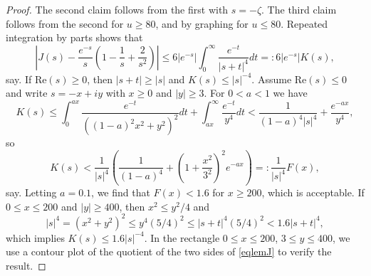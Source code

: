 \documentclass[11pt]{amsart}
\begin{document}
\begin{proof}
The second claim follows from the first with $s=-\zeta$. 
The third claim follows from the second for $u\ge 80$, and by graphing for $u\le 80$. 
Repeated integration by parts shows that 
$$
\left|J(s)-\frac{e^{-s}}{s}\left(1-\frac{1}{s}+\frac{2}{s^2}\right) \right| 
\le 6 |e^{-s}| \int_0^\infty \frac{e^{-t}}{|s+t|^4}dt
=:  6 |e^{-s}|   K(s),
$$
say. If $\mathrm{Re}(s)\ge 0$, then $|s+t|\ge |s|$ and $K(s)\le |s|^{-4}$. 
Assume $\mathrm{Re}(s)\le 0$ and write $s=-x+iy$ with $x\ge 0$ and $|y|\ge 3$. 
For $0<a<1$ we have
$$
K(s) \le \int_0^{ax}\frac{e^{-t}}{((1-a)^2 x^2+y^2)^2} dt + \int_{ax}^\infty \frac{e^{-t}}{y^4}dt<\frac{1}{(1-a)^4|s|^4}+\frac{e^{-ax}}{y^4},
$$
so
$$
K(s) < \frac{1}{|s|^4} \left(\frac{1}{(1-a)^4}+ \left(1+\frac{x^2}{3^2}\right)^2 e^{-ax}\right) =: \frac{1}{|s|^4} F(x),
$$
say. Letting $a=0.1$, we find that $F(x)<1.6$ for $x\ge 200$, which is acceptable. 
If $0\le x \le 200$ and $|y|\ge 400$, then $x^2 \le y^2/4$ and 
$$
|s|^4 =(x^2+y^2)^2 \le y^4 (5/4)^2 \le |s+t|^4 (5/4)^2< 1.6 |s+t|^4,
$$
which implies $K(s)\le 1.6|s|^{-4}$. 
In the rectangle $0\le x \le 200$, $3\le y \le 400$, we use a contour plot 
of the quotient of the two sides of \eqref{eqlemJ} to verify the result. 
\end{proof}
\end{document}
